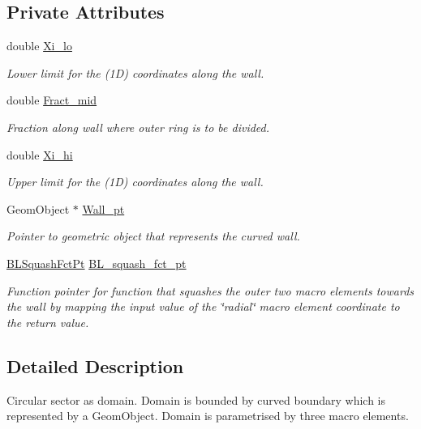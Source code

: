 \subsection*{Private Attributes}
\begin{DoxyCompactItemize}
\item 
double \hyperlink{classoomph_1_1QuarterCircleSectorDomain_afed5ccc21ccf6c6cd1dca65d58a5b708}{Xi\+\_\+lo}
\begin{DoxyCompactList}\small\item\em Lower limit for the (1D) coordinates along the wall. \end{DoxyCompactList}\item 
double \hyperlink{classoomph_1_1QuarterCircleSectorDomain_ade78897c44c26af82ac90052f799796c}{Fract\+\_\+mid}
\begin{DoxyCompactList}\small\item\em Fraction along wall where outer ring is to be divided. \end{DoxyCompactList}\item 
double \hyperlink{classoomph_1_1QuarterCircleSectorDomain_aba0cc67782144fe066dd0d04ac9d79dd}{Xi\+\_\+hi}
\begin{DoxyCompactList}\small\item\em Upper limit for the (1D) coordinates along the wall. \end{DoxyCompactList}\item 
Geom\+Object $\ast$ \hyperlink{classoomph_1_1QuarterCircleSectorDomain_a59722c43d41fef0bc3df4cf6571930a8}{Wall\+\_\+pt}
\begin{DoxyCompactList}\small\item\em Pointer to geometric object that represents the curved wall. \end{DoxyCompactList}\item 
\hyperlink{classoomph_1_1QuarterCircleSectorDomain_a6cffab57f87c9f4ab01744647240bb1e}{B\+L\+Squash\+Fct\+Pt} \hyperlink{classoomph_1_1QuarterCircleSectorDomain_ae9b74ffcade9fdc1eeba26b4acced7a8}{B\+L\+\_\+squash\+\_\+fct\+\_\+pt}
\begin{DoxyCompactList}\small\item\em Function pointer for function that squashes the outer two macro elements towards the wall by mapping the input value of the \char`\"{}radial\char`\"{} macro element coordinate to the return value. \end{DoxyCompactList}\end{DoxyCompactItemize}


\subsection{Detailed Description}
Circular sector as domain. Domain is bounded by curved boundary which is represented by a Geom\+Object. Domain is parametrised by three macro elements. 

